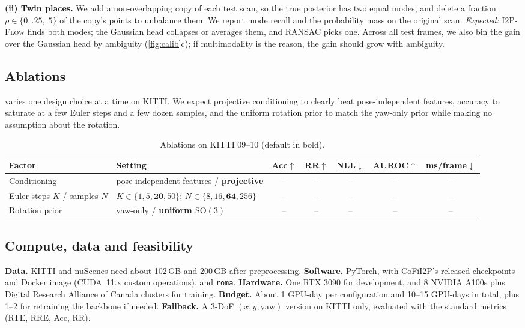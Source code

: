 \documentclass{article}
\newcommand{\SO}{\mathrm{SO}(3)}
\newcommand{\method}{\textsc{I2P-Flow}}
\newcommand{\ph}{\textcolor{gray}{--}}   %
\begin{document}
\textbf{(ii) Twin places.}
We add a non-overlapping copy of each test scan, so the true posterior has two equal modes, and delete a fraction $\rho\in\{0,.25,.5\}$ of the copy's points to unbalance them.
We report mode recall and the probability mass on the original scan.
\emph{Expected:} \method{} finds both modes; the Gaussian head collapses or averages them, and RANSAC picks one.
Across all test frames, we also bin the gain over the Gaussian head by ambiguity (\cref{fig:calib}c); if multimodality is the reason, the gain should grow with ambiguity.

\subsection{Ablations}
 varies one design choice at a time on KITTI. We expect projective conditioning to clearly beat pose-independent features, accuracy to saturate at a few Euler steps and a few dozen samples, and the uniform rotation prior to match the yaw-only prior while making no assumption about the rotation.

\begin{table}[h]
\centering\scriptsize
\caption{Ablations on KITTI 09--10 (default in bold).}
\label{tab:abl}
\begin{tabular}{@{}llccccc@{}}
\toprule
Factor & Setting & Acc$\uparrow$ & RR$\uparrow$ & NLL$\downarrow$ & AUROC$\uparrow$ & ms/frame$\downarrow$\\
\midrule
Conditioning & pose-independent features / \textbf{projective} & \ph & \ph & \ph & \ph & \ph\\
Euler steps $K$ / samples $N$ & $K\in\{1,5,\mathbf{20},50\}$; $N\in\{8,16,\mathbf{64},256\}$ & \ph & \ph & \ph & \ph & \ph\\
Rotation prior & yaw-only / \textbf{uniform $\SO$} & \ph & \ph & \ph & \ph & \ph\\
\bottomrule
\end{tabular}
\end{table}

\subsection{Compute, data and feasibility}
\textbf{Data.} KITTI and nuScenes need about 102\,GB and 200\,GB after preprocessing.
\textbf{Software.} PyTorch, with CoFiI2P's released checkpoints and Docker image (CUDA~11.x custom operations), and \texttt{roma}.
\textbf{Hardware.} One RTX 3090 for development, and 8 NVIDIA A100s plus Digital Research Alliance of Canada clusters for training.
\textbf{Budget.} About 1 GPU-day per configuration and 10--15 GPU-days in total, plus 1--2 for retraining the backbone if needed.
\textbf{Fallback.} A 3-DoF $(x,y,\text{yaw})$ version on KITTI only, evaluated with the standard metrics (RTE, RRE, Acc, RR).
\end{document}
